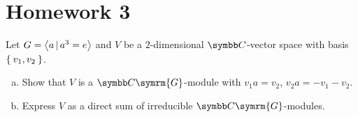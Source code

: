 \section*{Homework 3}

\begin{exercise}
Let \(G = \left\langle a \, | \, a^3 = e\right\rangle\) and \(V\) be a \(2\)-dimensional \(\complex\)-vector space with basis \(\Set{ v_1, v_2 }\).
\begin{enumerate}[a)]
    \item Show that \(V\) is a \(\complex \symrm{G}\)-module with \(v_1 a = v_2\), \(v_2 a = - v_1 - v_2\).
    
    \item Express \(V\) as a direct sum of irreducible \(\complex \symrm{G}\)-modules.
\end{enumerate}
\end{exercise}

